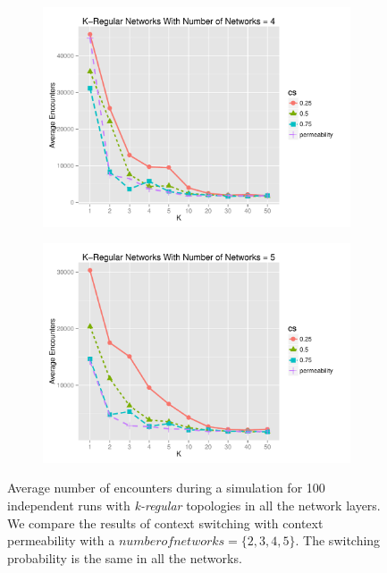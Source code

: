 \documentclass[preprint,number]{elsarticle}
\begin{document}
\begin{figure}[H]
\begin{subfigure}{.49\linewidth}
		\includegraphics[width=1\linewidth]{"../analysis/pdf/context_switching_encounters_comp_kregular_groupedbynets_4"}
		\caption{}
		\label{fig:ctx_switching_comp_kreg_4}
	\end{subfigure}
	\begin{subfigure}{.5\linewidth}
		\centering
		\includegraphics[width=1\linewidth]{"../analysis/pdf/context_switching_encounters_comp_kregular_groupedbynets_5"}
		\caption{}
		\label{fig:ctx_switching_comp_kreg_5}
	\end{subfigure}
	\begin{minipage}{0.9\textwidth}
		\vspace{0.2cm}
		\caption{Average number of encounters during a simulation for 100 independent runs with \textit{k-regular} topologies in all the network layers. We compare the results of context switching with context permeability with a $number of networks = \{2,3,4,5\}$. The switching probability is the same in all the networks. }
		\label{fig:ctx_switching_comp_kreg}
	\end{minipage}
\end{figure}
\end{document}
